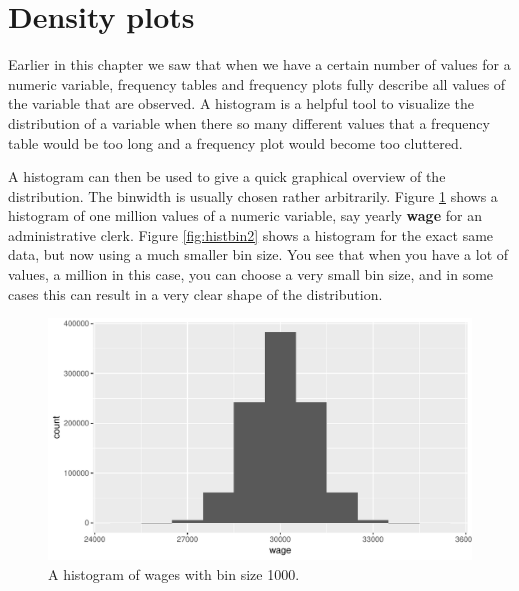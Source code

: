 \documentclass[]{report}\usepackage[]{graphicx}\usepackage[]{color}
\makeatletter
\def\maxwidth{ %
  \ifdim\Gin@nat@width>\linewidth
    \linewidth
  \else
    \Gin@nat@width
  \fi
}
\newenvironment{knitrout}{}{} %
\makeatother
\begin{document}
\section{Density plots}

Earlier in this chapter we saw that when we have a certain number of values for a numeric variable, frequency tables and frequency plots fully describe all values of the variable that are observed. A histogram is a helpful tool to visualize the distribution of a variable when there so many different values that a frequency table would be too long and a frequency plot would become too cluttered. 


A histogram can then be used to give a quick graphical overview of the distribution. The binwidth is usually chosen rather arbitrarily. Figure \ref{fig:histbin1} shows a histogram of one million values of a numeric variable, say yearly \textbf{wage} for an administrative clerk. Figure \ref{fig:histbin2} shows a histogram for the exact same data, but now using a much smaller bin size. You see that when you have a lot of values, a million in this case, you can choose a very small bin size, and in some cases this can result in a very clear shape of the distribution.

\begin{knitrout}
\color{fgcolor}\begin{figure}

{\centering \includegraphics[width=\maxwidth]{figure/histbin1-1} 

}

\caption[A histogram of wages with bin size 1000]{A histogram of wages with bin size 1000.}\label{fig:histbin1}
\end{figure}


\end{knitrout}
\end{document}
